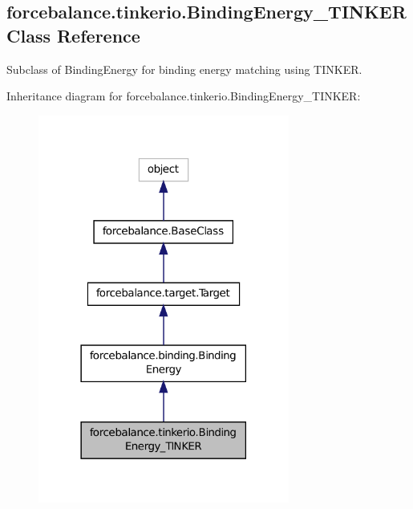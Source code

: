 \hypertarget{classforcebalance_1_1tinkerio_1_1BindingEnergy__TINKER}{\subsection{forcebalance.\-tinkerio.\-Binding\-Energy\-\_\-\-T\-I\-N\-K\-E\-R Class Reference}
\label{classforcebalance_1_1tinkerio_1_1BindingEnergy__TINKER}
}


Subclass of Binding\-Energy for binding energy matching using T\-I\-N\-K\-E\-R.  




Inheritance diagram for forcebalance.\-tinkerio.\-Binding\-Energy\-\_\-\-T\-I\-N\-K\-E\-R\-:
\nopagebreak
\begin{figure}[H]
\begin{center}
\leavevmode
\includegraphics[width=234pt]{classforcebalance_1_1tinkerio_1_1BindingEnergy__TINKER__inherit__graph}
\end{center}
\end{figure}


